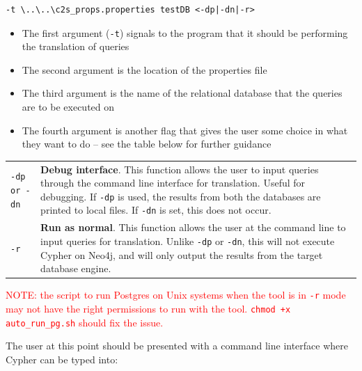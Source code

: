 \documentclass[letterpaper]{ltxdoc}
\begin{document}
\medskip

\begin{verbatim}
-t \..\..\c2s_props.properties testDB <-dp|-dn|-r>
\end{verbatim}

\medskip

\begin{itemize}
\item The first argument (\texttt{-t}) signals to the program that it should be performing the translation of queries
\item The second argument is the location of the properties file
\item The third argument is the name of the relational database that the queries are to be executed on
\item The fourth argument is another flag that gives the user some choice in what they want to do -- see the table below for further guidance
\end{itemize}

\begin{center}
\begin{tabular}{ p{2cm} p{11.5cm} }
\texttt{-dp or -dn} & \textbf{Debug interface}. This function allows the user to input queries through the command line interface for translation. Useful for debugging. If \texttt{-dp} is used, the results from both the databases are printed to local files. If \texttt{-dn} is set, this does not occur. \\

\texttt{-r} & \textbf{Run as normal}. This function allows the user at the command line to input queries for translation. Unlike \texttt{-dp} or \texttt{-dn}, this will not execute Cypher on Neo4j, and will only output the results from the target database engine.
\end{tabular}
\end{center}

\medskip

\textcolor{red}{NOTE: the script to run Postgres on Unix systems when the tool is in \texttt{-r} mode may not have the right permissions to run with the tool. \texttt{chmod +x auto\_run\_pg.sh} should fix the issue.}

\medskip

The user at this point should be presented with a command line interface where Cypher can be typed into:
\end{document}
